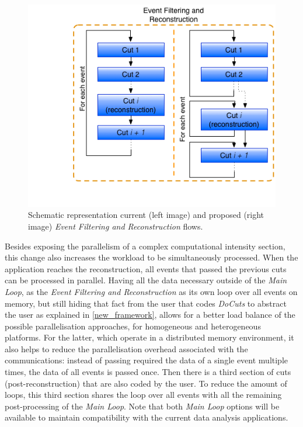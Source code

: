 \begin{figure}[!htp]
	\begin{center}
		\includegraphics[scale=0.5]{imgs/new_docuts.png}
		\caption{Schematic representation current (left image) and proposed (right image) \textit{Event Filtering and Reconstruction} flows.}
		\label{fig:new_docuts}
	\end{center}
\end{figure}


Besides exposing the parallelism of a complex computational intensity section, this change also increases the workload to be simultaneously processed. When the application reaches the reconstruction, all events that passed the previous cuts can be processed in parallel. Having all the data necessary outside of the \textit{Main Loop}, as the \textit{Event Filtering and Reconstruction} as its own loop over all events on memory, but still hiding that fact from the user that codes \textit{DoCuts} to abstract the user as explained in \ref{new_framework}, allows for a better load balance of the possible parallelisation approaches, for homogeneous and heterogeneous platforms. For the latter, which operate in a distributed memory environment, it also helps to reduce the parallelisation overhead associated with the communications: instead of passing required the data of a single event multiple times, the data of all events is passed once. Then there is a third section of cuts (post-reconstruction) that are also coded by the user. To reduce the amount of loops, this third section shares the loop over all events with all the remaining post-processing of the \textit{Main Loop}. Note that both \textit{Main Loop} options will be available to maintain compatibility with the current data analysis applications.

